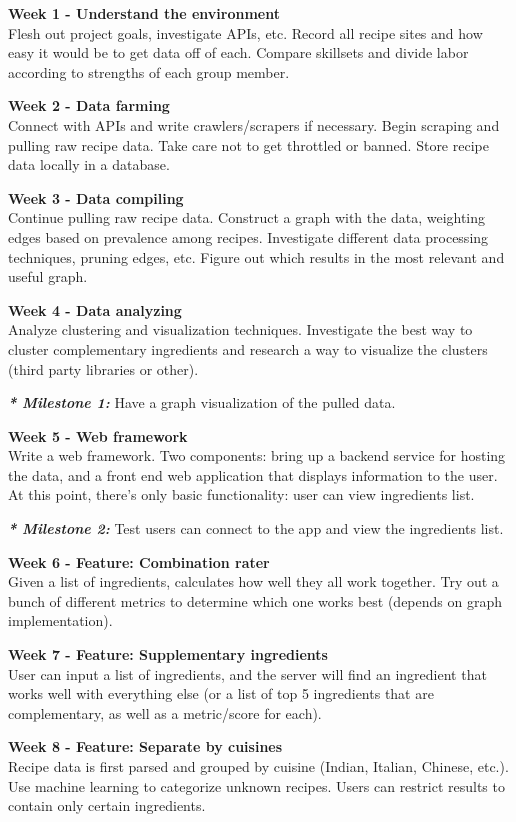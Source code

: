 \textbf{Week 1 - Understand the environment} \\
Flesh out project goals, investigate APIs, etc. Record all recipe sites and how easy it would be to get data off of each. Compare skillsets and divide labor according to strengths of each group member.

\textbf{Week 2 - Data farming} \\
Connect with APIs and write crawlers/scrapers if necessary. Begin scraping and pulling raw recipe data. Take care not to get throttled or banned. Store recipe data locally in a database.

\textbf{Week 3 - Data compiling} \\
Continue pulling raw recipe data. Construct a graph with the data, weighting edges based on prevalence among recipes. Investigate different data processing techniques, pruning edges, etc. Figure out which results in the most relevant and useful graph.

\textbf{Week 4 - Data analyzing} \\
Analyze clustering and visualization techniques. Investigate the best way to cluster complementary ingredients and research a way to visualize the clusters (third party libraries or other). 

{\em \textbf{* Milestone 1:}} Have a graph visualization of the pulled data. 

\textbf{Week 5 - Web framework} \\
Write a web framework. Two components: bring up a backend service for hosting the data, and a front end web application that displays information to the user. At this point, there's only basic functionality: user can view ingredients list.

{\em \textbf{* Milestone 2:}} Test users can connect to the app and view the ingredients list.

\textbf{Week 6 - Feature: Combination rater} \\
Given a list of ingredients, calculates how well they all work together. Try out a bunch of different metrics to determine which one works best (depends on graph implementation). 

\textbf{Week 7 - Feature: Supplementary ingredients} \\
User can input a list of ingredients, and the server will find an ingredient that works well with everything else (or a list of top 5 ingredients that are complementary, as well as a metric/score for each). 

\textbf{Week 8 - Feature: Separate by cuisines} \\
Recipe data is first parsed and grouped by cuisine (Indian, Italian, Chinese, etc.). Use machine learning to categorize unknown recipes. Users can restrict results to contain only certain ingredients.

